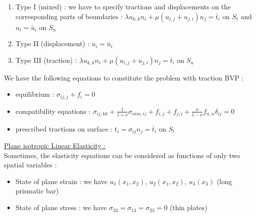 \documentclass[../main.tex]{subfiles}
\begin{document}
\begin{enumerate}
    \item Type I (mixed) : we have to specify tractions and displacements on the corresponding parts of boundaries : $\lambda u_{k,k} n_i + \mu (u_{i,j} + u_{j,i}) n_j = \overline{t}_i$ on $S_t$ and $u_i = \overline{u}_i$ on $S_u$\\
    \item Type II (displacement) : $u_i = \overline{u}_i$\\
    \item Type III (traction) : $\lambda u_{k,k} n_i + \mu (u_{i,j} + u_{j,i}) n_j = \overline{t}_i$ on $S_u$\\
\end{enumerate}

We have the following equations to constitute the problem with traction BVP : \begin{itemize}
    \item equilibrium : $\sigma_{ij,j} + f_i = 0$\\
    \item compatibility equations : $\sigma_{ij,kk} + \frac{1}{1+\nu} \sigma_{mm,ij} + f_{i,j} + f_{j,i} + \frac{\nu}{1-\nu} f_{n,n} \delta_{ij} = 0$\\
    \item prescribed tractions on surface : $t_i = \sigma_{ij} n_j = \overline{t}_i$ on $S_t$\\
\end{itemize}

\quad \underline{Plane isotropic Linear Elasticity :}\\
Sometimes, the elasticity equations can be considered as functions of only two spatial variables : \begin{itemize}
    \item State of plane strain : we have $u_1(x_1,x_2)$, $u_2(x_1,x_2)$, $u_3(x_3)$ (long prismatic bar)\\
    \item State of plane stress : we have $\sigma_{33} = \sigma_{13} = \sigma_{23} = 0$ (thin plates)\\
\end{itemize}
\end{document}
